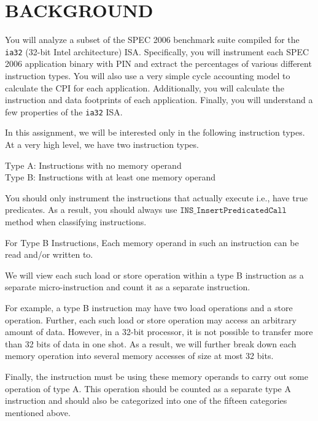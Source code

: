 \documentclass{article}
\begin{document}

\newpage

\section*{BACKGROUND}
You will analyze a subset of the SPEC 2006 benchmark suite compiled for the \texttt{ia32} (32-bit Intel architecture) ISA. Specifically, you will instrument each SPEC 2006 application binary with PIN and extract the percentages of various different instruction types. You will also use a very simple cycle accounting model to calculate the CPI for each application. Additionally, you will calculate the instruction and data footprints of each application. Finally, you will understand a few properties of the \texttt{ia32} ISA.

In this assignment, we will be interested only in the following instruction types. At a very high level, we have two instruction types.

\vspace{10pt}
\noindent
Type A: Instructions with no memory operand \\
Type B: Instructions with at least one memory operand
\vspace{10pt}

You should only instrument the instructions that actually execute i.e., have true predicates. As a result, you should always use $\texttt{INS\_InsertPredicatedCall}$ method when classifying instructions.

For Type B Instructions, Each memory operand in such an instruction can be read and/or written to.

We will view each such load or store operation within a type B instruction as a separate micro-instruction and count it as a separate instruction.

For example, a type B instruction may have two load operations and a store operation. Further, each such load or store operation may access an arbitrary amount of data. However, in a 32-bit processor, it is not possible to transfer more than 32 bits of data in one shot. As a result, we will further break down each memory operation into several memory accesses of size at most 32 bits.

Finally, the instruction must be using these memory operands to carry out some operation of type A. This operation should be counted as a separate type A instruction and should also be categorized into one of the fifteen categories mentioned above.
\end{document}
